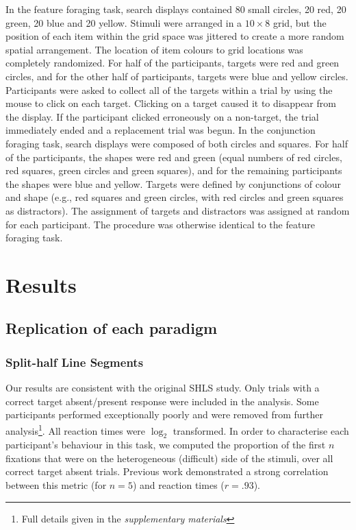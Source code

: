\documentclass[]{rsos}%
\begin{document}
In the feature foraging task, search displays contained 80 small circles, 20 red, 20 green, 20 blue and 20 yellow. Stimuli were arranged in a $10 \times 8$ grid, but the position of each item within the grid space was jittered to create a more random spatial arrangement. The location of item colours to grid locations was completely randomized. For half of the participants, targets were red and green circles, and for the other half of participants, targets were blue and yellow circles. Participants were asked to collect all of the targets within a trial by using the mouse to click on each target. Clicking on a target caused it to disappear from the display. If the participant clicked erroneously on a non-target, the trial immediately ended and a replacement trial was begun. In the conjunction foraging task, search displays were composed of both circles and squares. For half of the participants, the shapes were red and green (equal numbers of red circles, red squares, green circles and green squares), and for the remaining participants the shapes were blue and yellow. Targets were defined by conjunctions of colour and shape (e.g., red squares and green circles, with red circles and green squares as distractors). The assignment of targets and distractors was assigned at random for each participant. The procedure was otherwise identical to the feature foraging task. 

\section{Results}

\subsection{Replication of each paradigm}

\subsubsection{Split-half Line Segments}

Our results are consistent with the original SHLS study\cite{nowakowska2017}. Only trials with a correct target absent/present response were included in the analysis. Some participants performed exceptionally poorly and were removed from further analysis\footnote{Full details given in the \textit{supplementary materials}}. All reaction times were $\log_2$ transformed. In order to characterise each participant's behaviour in this task, we computed the proportion of the first $n$ fixations that were on the heterogeneous (difficult) side of the stimuli, over all correct target absent trials. Previous work\cite{nowakowska2017} demonstrated a strong correlation between this metric (for $n=5$) and reaction times ($r=.93$).
\end{document}
